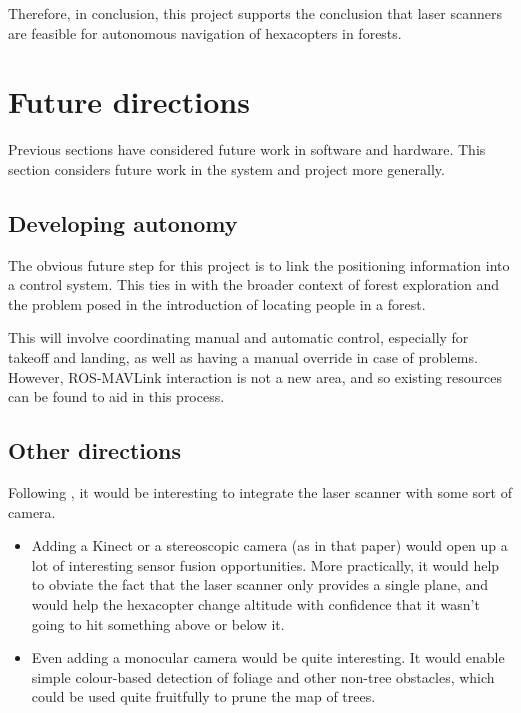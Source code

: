\documentclass[12pt,oneside,a4paper,draft]{book}
\begin{document}
Therefore, in conclusion, this project supports the conclusion that
laser scanners are feasible for autonomous navigation of hexacopters
in forests.

\section{Future directions}
\label{sec:future-work}

Previous sections have considered future work in software and
hardware. This section considers future work in the system and project
more generally.

\subsection{Developing autonomy}
\label{sec:developing-autonomy}

The obvious future step for this project is to link the positioning
information into a control system. This ties in with the broader
context of forest exploration and the problem posed in the
introduction of locating people in a forest.

This will involve coordinating manual and automatic control,
especially for takeoff and landing, as well as having a manual
override in case of problems. However, ROS-MAVLink interaction is not
a new area, and so existing resources can be found to aid in this process.

\subsection{Other directions}
\label{sec:other-directions}

Following \cite{achtelik2009stereo}, it would be interesting to
integrate the laser scanner with some sort of camera.

\begin{itemize}
\item Adding a Kinect or a stereoscopic
camera (as in that paper) would open up a lot of interesting sensor
fusion opportunities. More practically, it would help to obviate the
fact that the laser scanner only provides a single plane, and would
help the hexacopter change altitude with confidence that it wasn't
going to hit something above or below it.
\item Even adding a monocular camera would be quite interesting. It
  would enable simple colour-based detection of foliage and other
  non-tree obstacles, which could be used quite fruitfully to prune
  the map of trees.
\end{itemize}
\end{document}

